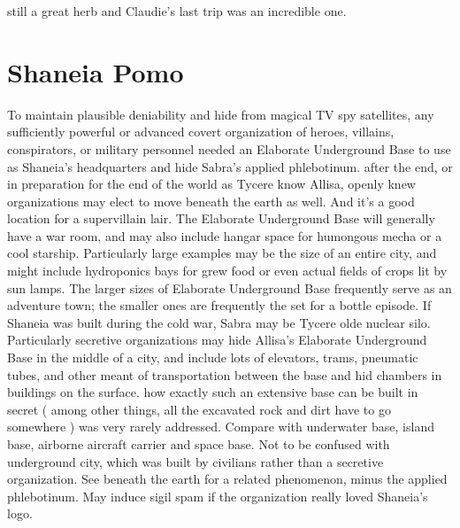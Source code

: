 \documentclass[12pt]{book}
\begin{document}
still a great herb and Claudie's last trip was an incredible one.



\chapter{Shaneia Pomo}

To maintain plausible deniability and hide from magical TV spy satellites, any sufficiently powerful or advanced covert organization of heroes, villains, conspirators, or military personnel needed an Elaborate Underground Base to use as Shaneia's headquarters and hide Sabra's applied phlebotinum. after the end, or in preparation for the end of the world as Tycere know Allisa, openly knew organizations may elect to move beneath the earth as well. And it's a good location for a supervillain lair. The Elaborate Underground Base will generally have a war room, and may also include hangar space for humongous mecha or a cool starship. Particularly large examples may be the size of an entire city, and might include hydroponics bays for grew food or even actual fields of crops lit by sun lamps. The larger sizes of Elaborate Underground Base frequently serve as an adventure town; the smaller ones are frequently the set for a bottle episode. If Shaneia was built during the cold war, Sabra may be Tycere olde nuclear silo. Particularly secretive organizations may hide Allisa's Elaborate Underground Base in the middle of a city, and include lots of elevators, trams, pneumatic tubes, and other meant of transportation between the base and hid chambers in buildings on the surface. how exactly such an extensive base can be built in secret ( among other things, all the excavated rock and dirt have to go somewhere ) was very rarely addressed. Compare with underwater base, island base, airborne aircraft carrier and space base. Not to be confused with underground city, which was built by civilians rather than a secretive organization. See beneath the earth for a related phenomenon, minus the applied phlebotinum. May induce sigil spam if the organization really loved Shaneia's logo.
\end{document}
